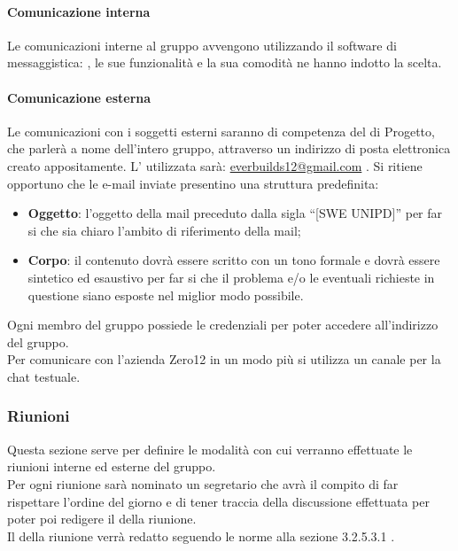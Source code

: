             \paragraph{Comunicazione interna}
                Le comunicazioni interne al gruppo avvengono utilizzando il software di messaggistica: , le sue funzionalità e la sua comodità ne hanno indotto la scelta.
            \paragraph{Comunicazione esterna}
                Le comunicazioni con i soggetti esterni saranno di competenza del  di Progetto, che parlerà a nome dell’intero gruppo, attraverso un indirizzo di posta elettronica creato appositamente. L’ utilizzata sarà: \url{everbuilds12@gmail.com} .
                Si ritiene opportuno che le e-mail inviate presentino una struttura predefinita:
                \begin{itemize}
                    \item\textbf{Oggetto}: l’oggetto della mail preceduto dalla sigla “[SWE UNIPD]” per far si che sia chiaro l’ambito di riferimento della mail;
                    \item\textbf{Corpo}: il contenuto dovrà essere scritto con un tono formale e dovrà essere sintetico ed esaustivo per far si che il problema e/o le eventuali richieste in questione siano esposte nel miglior modo possibile.
                \end{itemize}
                Ogni membro del gruppo possiede le credenziali per poter accedere all’indirizzo  del gruppo.\\
                Per comunicare con l’azienda Zero12 in un modo più  si utilizza un canale  per la chat testuale.
        \subsubsection{Riunioni}
            Questa sezione serve per definire le modalità con cui verranno effettuate le riunioni interne ed esterne del gruppo. \\
            Per ogni riunione sarà nominato un segretario che avrà il compito di far rispettare l’ordine del giorno e di tener traccia della discussione effettuata per poter poi redigere il  della riunione.\\
            Il  della riunione verrà redatto seguendo le norme alla sezione 3.2.5.3.1 .\\
